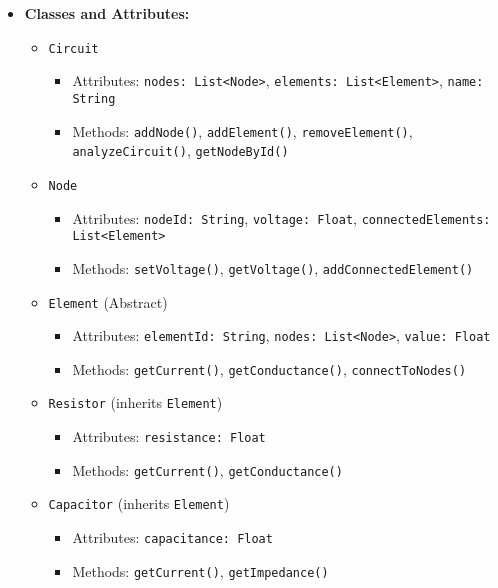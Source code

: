 \documentclass{article}
\begin{document}
\begin{itemize}
    \item \textbf{Classes and Attributes:}
    \begin{itemize}
        \item \texttt{Circuit}
        \begin{itemize}
            \item Attributes: \texttt{nodes: List<Node>}, \texttt{elements: List<Element>}, \texttt{name: String}
            \item Methods: \texttt{addNode()}, \texttt{addElement()}, \texttt{removeElement()}, \texttt{analyzeCircuit()}, \texttt{getNodeById()}
        \end{itemize}
        \item \texttt{Node}
        \begin{itemize}
            \item Attributes: \texttt{nodeId: String}, \texttt{voltage: Float}, \texttt{connectedElements: List<Element>}
            \item Methods: \texttt{setVoltage()}, \texttt{getVoltage()}, \texttt{addConnectedElement()}
        \end{itemize}
        \item \texttt{Element} (Abstract)
        \begin{itemize}
            \item Attributes: \texttt{elementId: String}, \texttt{nodes: List<Node>}, \texttt{value: Float}
            \item Methods: \texttt{getCurrent()}, \texttt{getConductance()}, \texttt{connectToNodes()}
        \end{itemize}
        \item \texttt{Resistor} (inherits \texttt{Element})
        \begin{itemize}
            \item Attributes: \texttt{resistance: Float}
            \item Methods: \texttt{getCurrent()}, \texttt{getConductance()}
        \end{itemize}
        \item \texttt{Capacitor} (inherits \texttt{Element})
        \begin{itemize}
            \item Attributes: \texttt{capacitance: Float}
            \item Methods: \texttt{getCurrent()}, \texttt{getImpedance()}
        \end{itemize}

\end{itemize}
\end{itemize}
\end{document}
